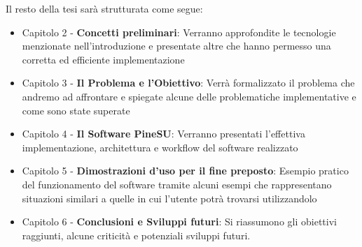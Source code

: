 Il resto della tesi sarà strutturata come segue:
\begin{itemize}
    \item Capitolo 2 - \textbf{Concetti preliminari}: Verranno approfondite le tecnologie menzionate nell’introduzione e presentate altre che hanno permesso una corretta ed efficiente implementazione
    \item Capitolo 3 - \textbf{Il Problema e l’Obiettivo}: Verrà formalizzato il problema che andremo ad affrontare e spiegate alcune delle problematiche implementative e come sono state superate
    \item Capitolo 4 - \textbf{Il Software PineSU}: Verranno presentati l’effettiva implementazione, architettura e workflow del software realizzato
    \item Capitolo 5 - \textbf{Dimostrazioni d’uso per il fine preposto}: Esempio pratico del funzionamento del software tramite alcuni esempi che rappresentano situazioni similari a quelle in cui l’utente potrà trovarsi utilizzandolo
    \item Capitolo 6 - \textbf{Conclusioni e Sviluppi futuri}: Si riassumono gli obiettivi raggiunti, alcune criticità e potenziali sviluppi futuri.
\end{itemize}
